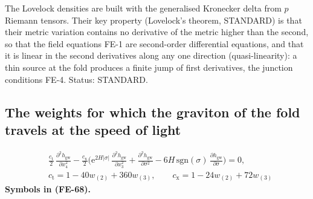 \documentclass[
  10pt,
]{article}
\begin{document}
The Lovelock densities are built with the generalised Kronecker delta
from \(p\) Riemann tensors. Their key property (Lovelock's theorem,
STANDARD) is that their metric variation contains no derivative of the
metric higher than the second, so that the field equations FE-1 are
second-order differential equations, and that it is linear in the second
derivatives along any one direction (quasi-linearity): a thin source at
the fold produces a finite jump of first derivatives, the junction
conditions FE-4. Status: STANDARD.

\hypertarget{the-weights-for-which-the-graviton-of-the-fold-travels-at-the-speed-of-light}{%
\subsection{The weights for which the graviton of the fold travels at
the speed of
light}\label{the-weights-for-which-the-graviton-of-the-fold-travels-at-the-speed-of-light}}

\[
\begin{aligned}
&\frac{c_{\mathrm{t}}}{2}\,\frac{\partial^2h_{\mathrm{gw}}}{\partial x_4^2}
 - \frac{c_{\mathrm{x}}}{2}\Big(\mathrm{e}^{2H\lvert\sigma\rvert}\,\frac{\partial^2h_{\mathrm{gw}}}{\partial x_3^2}
 + \frac{\partial^2h_{\mathrm{gw}}}{\partial\sigma^2} - 6H\,\mathrm{sgn}(\sigma)\,\frac{\partial h_{\mathrm{gw}}}{\partial\sigma}\Big) = 0,\\
&c_{\mathrm{t}} = 1 - 40w_{(2)} + 360w_{(3)},\qquad c_{\mathrm{x}} = 1 - 24w_{(2)} + 72w_{(3)}
\end{aligned} \tag{FE-68}
\] \textbf{Symbols in (FE-68).}
\end{document}
